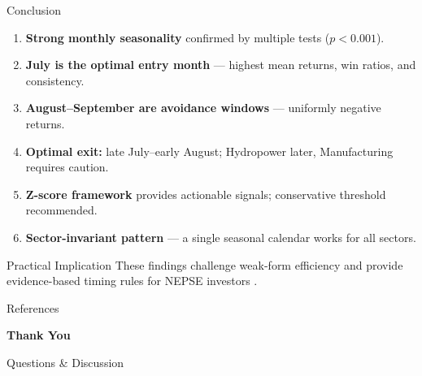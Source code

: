 \documentclass[10pt, aspectratio=169]{beamer}
\begin{document}
\begin{frame}{Conclusion}
\begin{enumerate}
    \item \textbf{Strong monthly seasonality} confirmed by multiple tests ($p<0.001$).
    \item \textbf{July is the optimal entry month} --- highest mean returns, win ratios, and consistency.
    \item \textbf{August--September are avoidance windows} --- uniformly negative returns.
    \item \textbf{Optimal exit:} late July--early August; Hydropower later, Manufacturing requires caution.
    \item \textbf{Z-score framework} provides actionable signals; conservative threshold recommended.
    \item \textbf{Sector-invariant pattern} --- a single seasonal calendar works for all sectors.
\end{enumerate}
\begin{block}{Practical Implication}
These findings challenge weak-form efficiency \cite{basnet2022efficient, joshi2025broad} and provide evidence-based timing rules for NEPSE investors \cite{gurung2024fiscal, adhikari2024calendar}.
\end{block}
\end{frame}

\begin{frame}[allowframebreaks]{References}


\end{frame}

\begin{frame}
\centering
\Huge \textbf{Thank You}
\vspace{1cm}

\large Questions \& Discussion
\end{frame}
\end{document}
